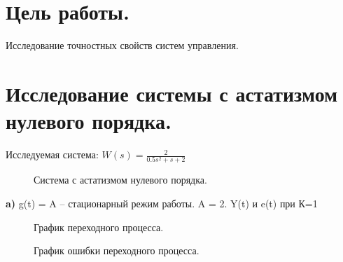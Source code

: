 \documentclass[a4paper, 11pt]{article}
\begin{document}
	
\section*{Цель работы.}
Исследование точностных свойств систем управления.

\section*{Исследование системы с астатизмом нулевого порядка.}
Исследуемая система:
\large{$W(s)= \frac {2} {0.5s^2+s+2}$}

\begin{figure}[h]
    \caption{Система с астатизмом нулевого порядка.}
    \label{one}
\end{figure}
\normalsize{\textbf{a)} g(t) = A – стационарный режим работы. A = 2.}
Y(t) и e(t) при К=1
\begin{figure}[h]
    \caption{График переходного процесса.}
    \label{two}
\end{figure}

\newpage 

\begin{figure}[h]
    \caption{График ошибки переходного процесса.}
    \label{tree}
\end{figure}
\end{document}
